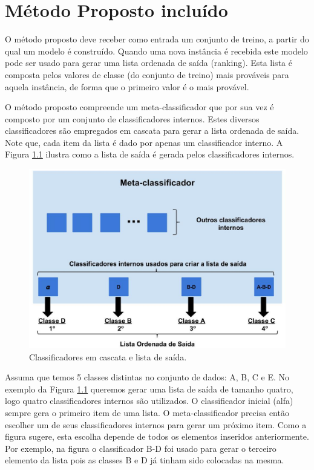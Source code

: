 \chapter{Método Proposto incluído}

O método proposto deve receber como entrada um conjunto de treino, a partir do qual um modelo é construído. Quando uma nova instância é recebida este modelo pode ser usado para gerar uma lista ordenada de saída (ranking). Esta lista é composta pelos valores de classe (do conjunto de treino) mais prováveis para aquela instância, de forma que o primeiro valor é o mais provável. 

O método proposto compreende um meta-classificador que por sua vez é composto por um conjunto de classificadores internos. Estes diversos classificadores são empregados em cascata para gerar a lista ordenada de saída. Note que, cada item da lista é dado por apenas um classificador interno. A Figura \ref{fig:metodoproposto01} ilustra como a lista de saída é gerada pelos classificadores internos.

\begin{figure}[h!]
  \includegraphics[width=\linewidth]{images/metodoproposto01.eps}
  \caption{Classificadores em cascata e lista de saída.}
  \label{fig:metodoproposto01}
\end{figure}

Assuma que temos 5 classes distintas no conjunto de dados: A, B, C e E. No exemplo da Figura \ref{fig:metodoproposto01} queremos gerar uma lista de saída de tamanho quatro, logo quatro classificadores internos são utilizados. O classificador inicial (alfa) sempre gera o primeiro item de uma lista. O meta-classificador precisa então escolher um de seus classificadores internos para gerar um próximo item. Como a figura sugere, esta escolha depende de todos os elementos inseridos anteriormente. Por exemplo, na figura o classificador B-D foi usado para gerar o terceiro elemento da lista pois as classes B e D já tinham sido colocadas na mesma.

